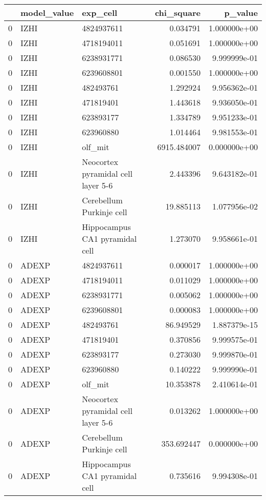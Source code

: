 \begin{tabular}{lllrr}
\toprule
{} & model\_value &                            exp\_cell &   chi\_square &       p\_value \\
\midrule
0 &        IZHI &                          4824937611 &     0.034791 &  1.000000e+00 \\
0 &        IZHI &                          4718194011 &     0.051691 &  1.000000e+00 \\
0 &        IZHI &                          6238931771 &     0.086530 &  9.999999e-01 \\
0 &        IZHI &                          6239608801 &     0.001550 &  1.000000e+00 \\
0 &        IZHI &                           482493761 &     1.292924 &  9.956362e-01 \\
0 &        IZHI &                           471819401 &     1.443618 &  9.936050e-01 \\
0 &        IZHI &                           623893177 &     1.334789 &  9.951233e-01 \\
0 &        IZHI &                           623960880 &     1.014464 &  9.981553e-01 \\
0 &        IZHI &                             olf\_mit &  6915.484007 &  0.000000e+00 \\
0 &        IZHI &  Neocortex pyramidal cell layer 5-6 &     2.443396 &  9.643182e-01 \\
0 &        IZHI &            Cerebellum Purkinje cell &    19.885113 &  1.077956e-02 \\
0 &        IZHI &      Hippocampus CA1 pyramidal cell &     1.273070 &  9.958661e-01 \\
0 &       ADEXP &                          4824937611 &     0.000017 &  1.000000e+00 \\
0 &       ADEXP &                          4718194011 &     0.011029 &  1.000000e+00 \\
0 &       ADEXP &                          6238931771 &     0.005062 &  1.000000e+00 \\
0 &       ADEXP &                          6239608801 &     0.000083 &  1.000000e+00 \\
0 &       ADEXP &                           482493761 &    86.949529 &  1.887379e-15 \\
0 &       ADEXP &                           471819401 &     0.370856 &  9.999575e-01 \\
0 &       ADEXP &                           623893177 &     0.273030 &  9.999870e-01 \\
0 &       ADEXP &                           623960880 &     0.140222 &  9.999990e-01 \\
0 &       ADEXP &                             olf\_mit &    10.353878 &  2.410614e-01 \\
0 &       ADEXP &  Neocortex pyramidal cell layer 5-6 &     0.013262 &  1.000000e+00 \\
0 &       ADEXP &            Cerebellum Purkinje cell &   353.692447 &  0.000000e+00 \\
0 &       ADEXP &      Hippocampus CA1 pyramidal cell &     0.735616 &  9.994308e-01 \\
\bottomrule
\end{tabular}
